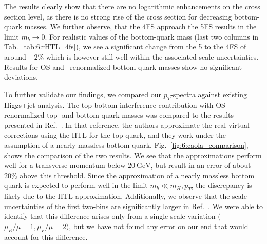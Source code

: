 The results clearly show that there are no logarithmic enhancements on the cross section level, as there is no strong rise of the cross section for decreasing bottom-quark masses. We further observe, that the 4\acs{FS} approach the 5\acs{FS} results in the limit $m_b \rightarrow 0$. For realistic values of the bottom-quark mass (last two columns in Tab.~\ref{tab:6:rHTL_4fs}), we see a significant change from the 5 to the 4\acs{FS} of around $-2\%$ which is however still well within the associated scale uncertainties. Results for \acs{OS} and \MS\ renormalized bottom-quark masses show no significant deviations.

To further validate our findings, we compared our $p_T$-spectra against existing Higgs+jet analysis. The top-bottom interference contribution with \acs{OS}-renormalized top- and bottom-quark masses was compared to the results presented in Ref.~\cite{Caola:2018zye}. In that reference, the authors approximate the real-virtual corrections using the \acs{HTL} for the top-quark, and they work under the assumption of a nearly massless bottom-quark. Fig.~\ref{fig:6:caola_comparison}, shows the comparison of the two results. We see that the approximations perform well for a transverse momentum below $20\ \mathrm{GeV}$, but result in an error of about $20\%$ above this threshold. Since the approximation of a nearly massless bottom quark is expected to perform well in the limit $m_b \ll m_H, p_T$, the discrepancy is likely due to the \acs{HTL} approximation. Additionally, we observe that the scale uncertainties of the first two-bins are significantly larger in Ref.~\cite{Caola:2018zye}. We were able to identify that this difference arises only from a single scale variation ($\mu_R/\mu = 1, \mu_F/\mu = 2)$, but we have not found any error on our end that would account for this difference.
